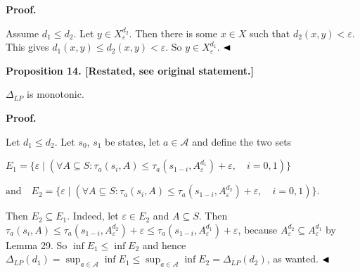  
\par\medskip\noindent\textbf{Proof.}\par
 
 
Assume $d_{1}\leq d_{2}$. Let $y\in X^{d_{2}}_{\varepsilon}$. Then there is some $x\in X$ such that $d_{2}(x,y)<\varepsilon$. This gives $d_{1}(x,y)\leq d_{2}(x,y)<\varepsilon$. So $y\in X^{d_{1}}_{\varepsilon}$. $\hfill\blacktriangleleft$\par
 
 
 
 
\par\medskip\noindent\textbf{Proposition 14. [Restated, see original statement.]}\par
 
 
$\Delta_{LP}$ is monotonic.\par
 
 
 
 


 
\par\medskip\noindent\textbf{Proof.}\par
 
 
Let $d_{1}\leq d_{2}$. Let $s_{0}$, $s_{1}$ be states, let $a\in\mathcal{A}$ and define the two sets\par
  
\par  \quad  $\displaystyle E_{1}$\quad  $\displaystyle=\{\varepsilon\mid(\forall A\subseteq S:\tau_{a}(s_{i},A)\leq\tau_{a}(s_{1-i},A^{d_{1}}_{\varepsilon})+\varepsilon,\quad i=0,1)\}$\quad  \quad  
 
\par  \quad  $\displaystyle\mbox{and}\quad E_{2}$\quad  $\displaystyle=\{\varepsilon\mid(\forall A\subseteq S:\tau_{a}(s_{i},A)\leq\tau_{a}(s_{1-i},A^{d_{2}}_{\varepsilon})+\varepsilon,\quad i=0,1)\}.$\quad  \quad  
  
Then $E_{2}\subseteq E_{1}$. Indeed, let $\varepsilon\in E_{2}$ and $A\subseteq S$. Then $\tau_{a}(s_{i},A)\leq\tau_{a}(s_{1-i},A^{d_{2}}_{\varepsilon})+\varepsilon\leq\tau_{a}(s_{1-i},A^{d_{1}}_{\varepsilon})+\varepsilon$, because $A^{d_{2}}_{\varepsilon}\subseteq A^{d_{1}}_{\varepsilon}$ by Lemma 29. So $\inf E_{1}\leq\inf E_{2}$ and hence $\Delta_{LP}(d_{1})=\sup_{a\in\mathcal{A}}\inf E_{1}\leq\sup_{a\in\mathcal{A}}\inf E_{2}=\Delta_{LP}(d_{2})$, as wanted. $\hfill\blacktriangleleft$\par
 
